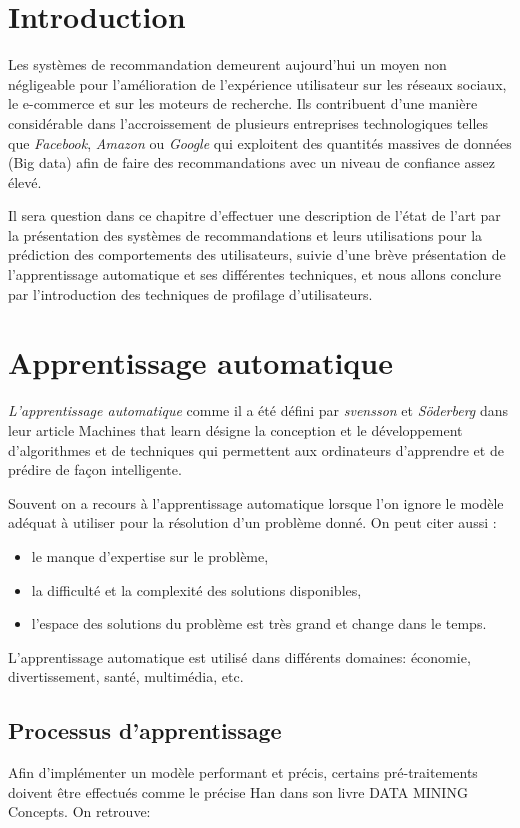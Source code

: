 
\newpage
\section{Introduction}
Les systèmes de recommandation demeurent aujourd'hui un moyen non négligeable pour l'amélioration de l'expérience utilisateur sur les réseaux sociaux, le e-commerce et sur les moteurs de recherche. Ils contribuent d'une manière considérable dans l'accroissement de plusieurs entreprises technologiques telles que \emph{Facebook}, \emph{Amazon} ou \emph{Google} qui exploitent des quantités massives de données (Big data) afin de faire des recommandations avec un niveau de confiance assez élevé.

Il sera question dans ce chapitre d'effectuer une description de l'état de l'art par la présentation des systèmes de recommandations et leurs utilisations pour la prédiction des comportements des utilisateurs, suivie d'une brève présentation de l'apprentissage automatique et ses différentes techniques, et nous allons conclure par l'introduction des techniques de profilage d'utilisateurs.

\section{Apprentissage automatique}
\emph{L'apprentissage automatique} comme il a été défini par \emph{svensson} et \emph{Söderberg} dans leur article \textquotedbl Machines that learn\textquotedbl \cite{svensson} désigne la conception et le développement d'algorithmes et de techniques qui permettent aux ordinateurs d'apprendre et de prédire de façon intelligente.

Souvent on a recours à l'apprentissage automatique lorsque l'on ignore le modèle adéquat à utiliser pour la résolution d'un problème donné. On peut citer aussi :
\begin{itemize}
    \item le manque d'expertise sur le problème,
    \item la difficulté et la complexité des solutions disponibles,
    \item l'espace des solutions du problème est très grand et change dans le temps. 
\end{itemize}
L'apprentissage automatique est utilisé dans différents domaines: économie, divertissement, santé, multimédia, etc.

\subsection{Processus d'apprentissage}
Afin d'implémenter un modèle performant et précis, certains pré-traitements doivent être effectués comme le précise Han dans son livre \textquotedbl DATA MINING Concepts\textquotedbl \cite{Han}. On retrouve:

